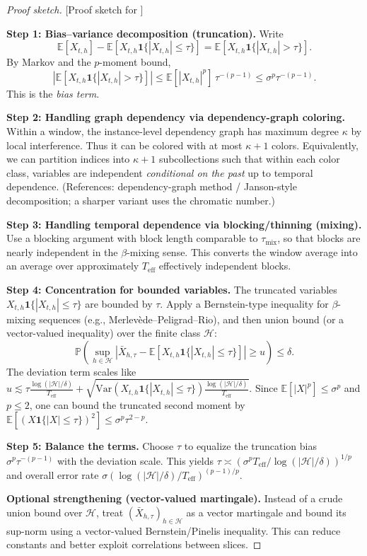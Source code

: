 \documentclass[11pt]{article}
\newcommand{\E}{\mathbb{E}}
\newcommand{\Pp}{\mathbb{P}} %
\newcommand{\Var}{\mathrm{Var}}
\newcommand{\1}{\mathbf{1}}
\newcommand{\cH}{\mathcal{H}}
\newcommand{\abs}[1]{\left|#1\right|}
\theoremstyle{plain}
\theoremstyle{definition}
\theoremstyle{remark}
\newenvironment{proofsketch}{\begin{proof}[Proof sketch]}{\end{proof}}
\begin{document}
\begin{proofsketch}[Proof sketch for ]

\textbf{Step 1: Bias--variance decomposition (truncation).}
Write
\[
\E[X_{t,h}] - \E[X_{t,h}\1\{\abs{X_{t,h}}\le \tau\}]
= \E[X_{t,h}\1\{\abs{X_{t,h}}>\tau\}].
\]
By Markov and the $p$-moment bound,
\[
\abs{\E[X_{t,h}\1\{\abs{X_{t,h}}>\tau\}]}
\le \E[\abs{X_{t,h}}^p]\,\tau^{-(p-1)} \le \sigma^p \tau^{-(p-1)}.
\]
This is the \emph{bias term}.

\medskip
\textbf{Step 2: Handling graph dependency via dependency-graph coloring.}
Within a window, the instance-level dependency graph has maximum degree $\kappa$ by local interference.
Thus it can be colored with at most $\kappa+1$ colors.
Equivalently, we can partition indices into $\kappa+1$ subcollections such that within each color class,
variables are independent \emph{conditional on the past} up to temporal dependence.
(References: dependency-graph method / Janson-style decomposition; a sharper variant uses the chromatic number.)

\medskip
\textbf{Step 3: Handling temporal dependence via blocking/thinning (mixing).}
Use a blocking argument with block length comparable to $\tau_{\mathrm{mix}}$,
so that blocks are nearly independent in the $\beta$-mixing sense.
This converts the window average into an average over approximately $T_{\mathrm{eff}}$ effectively independent blocks.

\medskip
\textbf{Step 4: Concentration for bounded variables.}
The truncated variables $X_{t,h}\1\{\abs{X_{t,h}}\le \tau\}$ are bounded by $\tau$.
Apply a Bernstein-type inequality for $\beta$-mixing sequences (e.g., Merlev\`ede--Peligrad--Rio),
and then union bound (or a vector-valued inequality) over the finite class $\cH$:
\[
\Pp\!\left(\sup_{h\in\cH}\abs{\bar X_{h,\tau}-\E[X_{t,h}\1\{\abs{X_{t,h}}\le \tau\}]}\ge u\right)
\le \delta.
\]
The deviation term scales like
$u\lesssim \tau\frac{\log(\abs{\cH}/\delta)}{T_{\mathrm{eff}}}
+\sqrt{\Var(X_{t,h}\1\{\abs{X_{t,h}}\le \tau\})\frac{\log(\abs{\cH}/\delta)}{T_{\mathrm{eff}}}}$.
Since $\E[\abs{X}^p]\le \sigma^p$ and $p\le 2$,
one can bound the truncated second moment by $\E[(X\1\{\abs{X}\le \tau\})^2]\le \sigma^p\tau^{2-p}$.

\medskip
\textbf{Step 5: Balance the terms.}
Choose $\tau$ to equalize the truncation bias $\sigma^p\tau^{-(p-1)}$ with the deviation scale.
This yields $\tau\asymp (\sigma^p T_{\mathrm{eff}}/\log(\abs{\cH}/\delta))^{1/p}$
and overall error rate $\sigma(\log(\abs{\cH}/\delta)/T_{\mathrm{eff}})^{(p-1)/p}$.

\medskip
\textbf{Optional strengthening (vector-valued martingale).}
Instead of a crude union bound over $\cH$, treat $(\bar X_{h,\tau})_{h\in\cH}$ as a vector martingale
and bound its sup-norm using a vector-valued Bernstein/Pinelis inequality.
This can reduce constants and better exploit correlations between slices.
\end{proofsketch}
\end{document}
